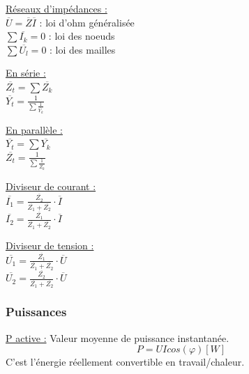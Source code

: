 \documentclass[../main.tex]{subfiles}
\begin{document}
\begin{minipage}{.3\textwidth}
\quad \underline{Réseaux d'impédances :}\\
$\overline{U} = \overline{Z} \overline{I}$ : loi d'ohm généralisée\\
$\sum \overline{I_k} = 0$ : loi des noeuds\\
$\sum \overline{U_l} = 0$ : loi des mailles\\
\end{minipage}
\vline
\begin{minipage}{.3\textwidth}
\quad \underline{En série :}\\
$\overline{Z_t} = \sum \overline{Z_k}$\\
$\overline{Y_t} = \frac{1}{\sum \frac{1}{\overline{Y_k}}}$\\
\end{minipage}
\vline
\begin{minipage}{.3\textwidth}
\quad \underline{En parallèle :}\\
$\overline{Y_t} = \sum \overline{Y_k}$\\
$\overline{Z_t} = \frac{1}{\sum \frac{1}{\overline{Z_k}}}$\\
\end{minipage}

\begin{minipage}{.5\textwidth}
    \quad \underline{Diviseur de courant :}\\
$\overline{I_1} = \frac{\overline{Z_2}}{\overline{Z_1}+\overline{Z_2}}\cdot \overline{I}$\\
$\overline{I_2} = \frac{\overline{Z_1}}{\overline{Z_1}+\overline{Z_2}}\cdot \overline{I}$\\

\end{minipage}
\vline
\begin{minipage}{.5\textwidth}
    \quad \underline{Diviseur de tension :}\\
$\overline{U_1} = \frac{\overline{Z_1}}{\overline{Z_1}+\overline{Z_2}}\cdot \overline{U}$\\
$\overline{U_2} = \frac{\overline{Z_2}}{\overline{Z_1}+\overline{Z_2}}\cdot \overline{U}$\\

\end{minipage}

\subsubsection{Puissances}
\quad \underline{P active :} Valeur moyenne de puissance instantanée.
\begin{equation}
    P = UIcos(\varphi)[W]
\end{equation}
C'est l'énergie réellement convertible en travail/chaleur.\\
\end{document}
